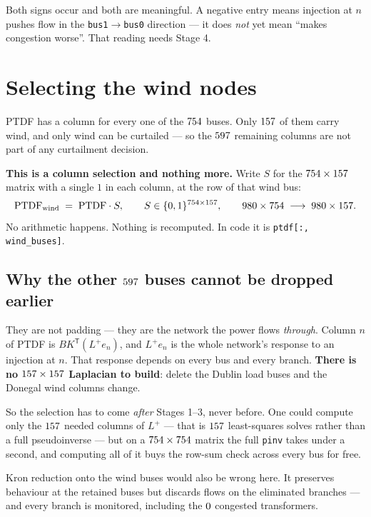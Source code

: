 \documentclass[11pt,a4paper]{article}
\newcommand{\T}{^{\mathsf{T}}}
\newcommand{\Lp}{L^{+}}
\newcommand{\note}[1]{{\color{soft}\small #1}}
\begin{document}
\note{Both signs occur and both are meaningful. A negative entry means
injection at $n$ pushes flow in the \texttt{bus1}$\to$\texttt{bus0} direction
--- it does \emph{not} yet mean ``makes congestion worse''. That reading needs
Stage 4.}

\newpage
\section{Selecting the wind nodes}

PTDF has a column for every one of the $754$ buses. Only $157$ of them
carry wind, and only wind can be curtailed --- so the $597$ remaining
columns are not part of any curtailment decision.

\textbf{This is a column selection and nothing more.} Write $S$ for the
$754 \times 157$ matrix with a single $1$ in each column, at the row of
that wind bus:
\begin{equation}
  \text{PTDF}_{\text{wind}} \;=\; \text{PTDF} \cdot S,
  \qquad
  S \in \{0,1\}^{754 \times 157},
  \qquad
  980 \times 754 \;\longrightarrow\; 980 \times 157 .
\end{equation}
No arithmetic happens. Nothing is recomputed. In code it is
\texttt{ptdf[:, wind\_buses]}.

\subsection*{Why the other \texorpdfstring{$597$}{597} buses cannot be dropped earlier}

They are not padding --- they are the network the power flows \emph{through}.
Column $n$ of PTDF is $B K\T (\Lp e_n)$, and $\Lp e_n$ is the whole network's
response to an injection at $n$. That response depends on every bus and every
branch. \textbf{There is no $157 \times 157$ Laplacian to build}:
delete the Dublin load buses and the Donegal wind columns change.

\medskip
So the selection has to come \emph{after} Stages 1--3, never before. One could
compute only the $157$ needed columns of $\Lp$ --- that is $157$
least-squares solves rather than a full pseudoinverse --- but on a
$754 \times 754$ matrix the full \texttt{pinv} takes under a second, and
computing all of it buys the row-sum check across every bus for free.

\note{Kron reduction onto the wind buses would also be wrong here. It preserves
behaviour at the retained buses but discards flows on the eliminated branches
--- and every branch is monitored, including the $0$ congested
transformers.}
\end{document}
